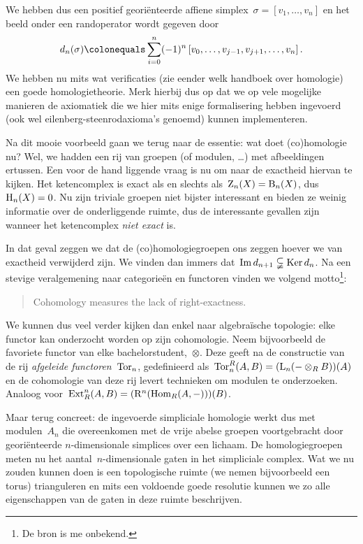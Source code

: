 \documentclass[a4paper,11pt,openany,oneside,article]{memoir}
\begin{document}
We hebben dus een positief geori\"enteerde affiene simplex~$\sigma=\left[ v_1,\ldots,v_n \right]$ en het beeld onder een randoperator wordt gegeven door
\begin{equation}
  d_n(\sigma)\colonequals\sum_{i=0}^n(-1)^n\left[ v_0,\ldots,v_{j-1},v_{j+1},\ldots,v_n \right].
\end{equation}
We hebben nu mits wat verificaties (zie eender welk handboek over homologie) een goede homologietheorie. Merk hierbij dus op dat we op vele mogelijke manieren de axiomatiek die we hier mits enige formalisering hebben ingevoerd (ook wel eilenberg-steenrodaxioma's genoemd) kunnen implementeren.

Na dit mooie voorbeeld gaan we terug naar de essentie: wat doet (co)homologie nu? Wel, we hadden een rij van groepen (of modulen, \ldots) met afbeeldingen ertussen. Een voor de hand liggende vraag is nu om naar de exactheid hiervan te kijken. Het ketencomplex is exact als en slechts als~$\mathrm{Z}_n(X)=\mathrm{B}_n(X)$, dus~$\mathrm{H}_n(X)=0$. Nu zijn triviale groepen niet bijster interessant en bieden ze weinig informatie over de onderliggende ruimte, dus de interessante gevallen zijn wanneer het ketencomplex \emph{niet exact} is.

In dat geval zeggen we dat de (co)homologiegroepen ons zeggen hoever we van exactheid verwijderd zijn. We vinden dan immers dat~$\operatorname{Im} d_{n+1}\subsetneqq\operatorname{Ker} d_n$. Na een stevige veralgemening naar categorie\"en en functoren vinden we volgend motto\footnote{De bron is me onbekend.}:
\begin{quote}
  Cohomology measures the lack of right-exactness.
\end{quote}

We kunnen dus veel verder kijken dan enkel naar algebra\"ische topologie: elke functor kan onderzocht worden op zijn cohomologie. Neem bijvoorbeeld de favoriete functor van elke bachelorstudent,~$\otimes$. Deze geeft na de constructie van de rij \emph{afgeleide functoren}~$\operatorname{Tor}_n$, gedefinieerd als~$\operatorname{Tor}^R_n(A,B)=(\mathrm{L}_n(-\otimes_R B))(A)$ en de cohomologie van deze rij levert technieken om modulen te onderzoeken. Analoog voor~$\operatorname{Ext}^n_R(A,B)=(\mathrm{R}^n(\operatorname{Hom}_R(A,-)))(B)$.

Maar terug concreet: de ingevoerde simpliciale homologie werkt dus met modulen~$A_n$ die overeenkomen met de vrije abelse groepen voortgebracht door geori\"enteerde $n$\nobreakdash-dimensionale simplices over een lichaam. De homologiegroepen meten nu het aantal~$n$-dimensionale gaten in het simpliciale complex. Wat we nu zouden kunnen doen is een topologische ruimte (we nemen bijvoorbeeld een torus) trianguleren en mits een voldoende goede resolutie kunnen we zo alle eigenschappen van de gaten in deze ruimte beschrijven.
\end{document}
